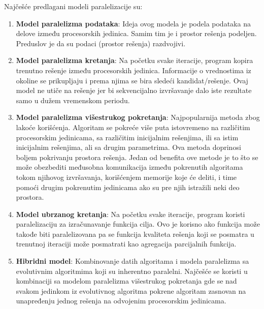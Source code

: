 \documentclass[a4paper]{article}
\begin{document}
Najčešće predlagani modeli paralelizacije su:

\begin{enumerate}
\item \textbf {Model paralelizma podataka}: \newline \indent
Ideja ovog modela je podela podataka na delove između procesorskih jedinica.
Samim tim je i prostor rešenja podeljen.
Preduslov je da su podaci (prostor rešenja) razdvojivi.

\item \textbf {Model paralelizma kretanja}: \newline \indent
Na početku svake iteracije, program kopira trenutno rešenje između procesorskih jedinica. Informacije o vrednostima iz okoline se prikupljaju i prema njima
se bira sledeći kandidat/rešenje. Ovaj model
ne utiče na rešenje jer bi sekvencijalno izvršavanje
dalo iste rezultate samo u dužem vremenskom periodu.

\item \textbf {Model paralelizma višestrukog pokretanja}: \newline \indent
Najpopularnija metoda zbog lakoće korišćenja.
Algoritam se pokreće više puta istovremeno na različitim procesorskim jedinicama, sa različitim inicijalnim rešenjima, ili sa istim inicijalnim rešenjima, ali sa drugim parametrima. Ova metoda doprinosi boljem pokrivanju prostora rešenja.
Jedan od benefita ove metode je to što se može obezbediti
međusobna komunikacija između pokrenutih algoritama tokom njihovog izvršavanja,
korišćenjem memorije koje će deliti, i time pomoći drugim pokrenutim jedinicama ako su pre njih istražili neki deo prostora. 

\item \textbf {Model ubrzanog kretanja}: \newline \indent
Na početku svake iteracije, program koristi
paralelizaciju za izračunavanje funkcija cilja. Ovo je korisno ako funkcija može takođe biti paralelizovana pa se funkcija kvaliteta rešenja koji se posmatra u trenutnoj iteraciji može posmatrati kao agregacija
 parcijalnih funkcija.

\item \textbf {Hibridni model}: \newline \indent
Kombinovanje datih algoritama i modela paralelizma sa evolutivnim algoritmima koji su inherentno paralelni. Najčešće se koristi u kombinaciji sa modelom paralelizma višestrukog pokretanja gde se nad svakom jedinkom iz evolutivnog algoritma pokrene algoritam zasnovan na unapređenju jednog rešenja na odvojenim procesorskim jedinicama.
\end{enumerate}
\end{document}
